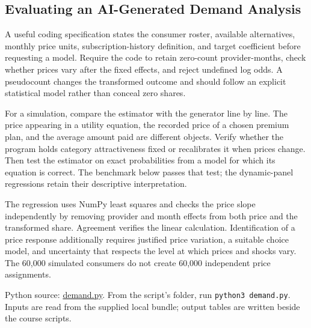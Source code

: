 \hypertarget{M08-evaluating-an-ai-generated-demand-analysis}{%
\subsection{Evaluating an AI-Generated Demand
Analysis}\label{M08-evaluating-an-ai-generated-demand-analysis}}

\noindent A useful coding specification states the consumer roster, available
alternatives, monthly price units, subscription-history definition, and
target coefficient before requesting a model. Require the code to retain
zero-count provider-months, check whether prices vary after the fixed
effects, and reject undefined log odds. A pseudocount changes the
transformed outcome and should follow an explicit statistical model
rather than conceal zero shares.

For a simulation, compare the estimator with the generator line by line.
The price appearing in a utility equation, the recorded price of a
chosen premium plan, and the average amount paid are different objects.
Verify whether the program holds category attractiveness fixed or
recalibrates it when prices change. Then test the estimator on exact
probabilities from a model for which its equation is correct. The
benchmark below passes that test; the dynamic-panel regressions retain
their descriptive interpretation.

The regression uses NumPy least squares and checks the price slope
independently by removing provider and month effects from both price and
the transformed share. Agreement verifies the linear calculation.
Identification of a price response additionally requires justified price
variation, a suitable choice model, and uncertainty that respects the
level at which prices and shocks vary. The 60,000 simulated consumers do
not create 60,000 independent price assignments.

\FloatBarrier
{}
Python source:
\href{../03_Data_and_Code/GenAI_Demand/demand.py}{demand.py}. From the
script's folder, run \texttt{python3\ demand.py}. Inputs are read from
the supplied local bundle; output tables are written beside the course
scripts.

